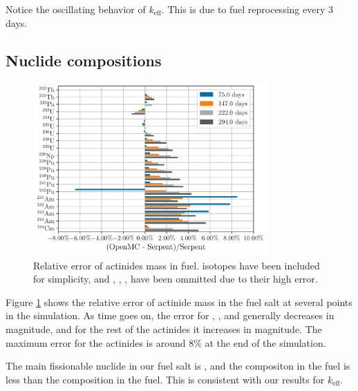 Notice the oscillating behavior of $k_\text{eff}$. This is due to fuel
reprocessing every 3 days.%

\subsection{Nuclide compositions}
\label{sub:nuclide-compositions}

\begin{figure}[htpb]
    \centering
    \includegraphics[width=0.8\textwidth]{figs/ch5/actinides.pdf}
    \caption{Relative error of actinides mass in fuel.  isotopes have
    been included for simplicity, and , ,
    ,  have been ommitted due to their high error.}
    \label{fig:actinides}
\end{figure}

Figure \ref{fig:actinides} shows the relative error of actinide mass in the fuel
salt at several points in the simulation. As time goes on, the error for
, , and  generally decreases in
magnitude, and for the rest of the actinides it increases in magnitude. The
maximum error for the actinides is around 8\% at the end of the simulation.

The main fissionable nuclide in our fuel salt is , and the
compositon in the \OpenMC fuel is less than the composition in the \SerpentTWO
fuel. This is consistent with our results for $k_\text{eff}$.


